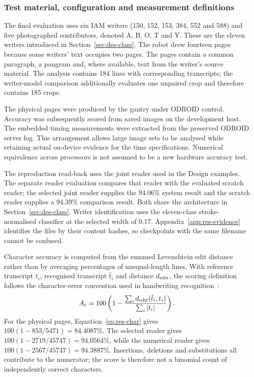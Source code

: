 \subsubsection{Test material, configuration and measurement definitions}
\label{sec:res-method}
The final evaluation uses six IAM writers (150, 152, 153, 384, 552 and 588) and five photographed contributors, denoted A, B, O, T and Y. These are the eleven writers introduced in Section~\ref{sec:des-class}. The robot drew fourteen pages because some writers' text occupies two pages. The pages contain a common paragraph, a pangram and, where available, text from the writer's source material. The analysis contains 184 lines with corresponding transcripts; the writer-model comparison additionally evaluates one unpaired crop and therefore contains 185 crops.

The physical pages were produced by the gantry under ODROID control. Accuracy was subsequently scored from saved images on the development host. The embedded timing measurements were extracted from the preserved ODROID server log. This arrangement allows large image sets to be analysed while retaining actual on-device evidence for the time specifications. Numerical equivalence across processors is not assumed to be a new hardware accuracy test.

The reproduction read-back uses the joint reader used in the Design examples. The separate reader evaluation compares that reader with the evaluated scratch reader; the selected joint reader supplies the 94.06\% system result and the scratch reader supplies a 94.39\% comparison result. Both share the architecture in Section~\ref{sec:des-class}. Writer identification uses the eleven-class stroke-normalised classifier at the selected width of 0.17. Appendix~\ref{app:res-evidence} identifies the files by their content hashes, so checkpoints with the same filename cannot be confused.

Character accuracy is computed from the summed Levenshtein edit distance rather than by averaging percentages of unequal-length lines. With reference transcript $t_i$, recognised transcript $\hat t_i$ and distance $d_{\rm edit}$, the scoring definition follows the character-error convention used in handwriting recognition~\cite[PDF p.~2, Sec.~2.1]{graves2006}:
\begin{equation}
A_c=100\left(1-\frac{\sum_i d_{\rm edit}(\hat t_i,t_i)}{\sum_i|t_i|}\right).
\label{eq:res-char}
\end{equation}
For the physical pages, Equation~\ref{eq:res-char} gives $100(1-853/5471)=84.4087\%$. The selected reader gives $100(1-2719/45747)=94.0564\%$, while the numerical reader gives $100(1-2567/45747)=94.3887\%$. Insertions, deletions and substitutions all contribute to the numerator; the score is therefore not a binomial count of independently correct characters.


